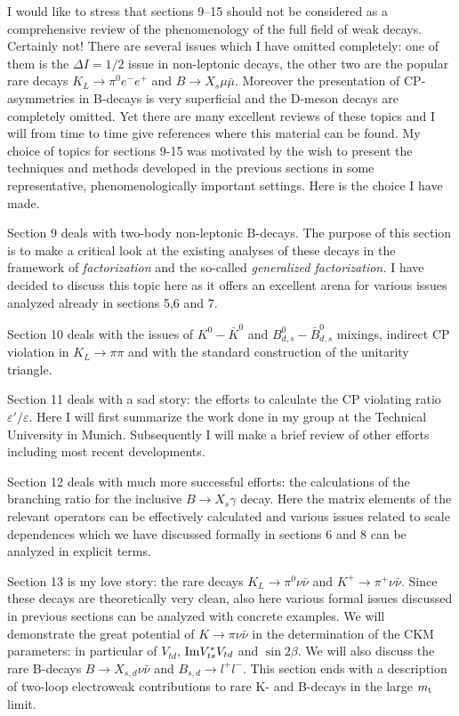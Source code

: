 \documentclass[12pt,rotate]{article}
\newcommand{\IM}{{\rm Im}}
\def\epe{\varepsilon'/\varepsilon}
\newcommand{\mt}{m_{\rm t}}
\newcommand{\Bsg}{$B \to X_s \gamma$ }
\begin{document}
I would like to stress that sections 9--15 should not be considered as a
comprehensive review of the phenomenology of the full field of weak decays.
Certainly not! There are several issues which I have omitted completely: one
of them is the $\Delta I=1/2$ issue in non-leptonic decays, 
the other two are the
popular rare decays $K_L\to\pi^0 e^-e^+$ and $B\to X_s\mu\bar\mu$. 
Moreover the presentation of CP-asymmetries in
B-decays is very superficial and the D-meson decays are completely omitted.
Yet there are many excellent reviews of these
topics and I will from time to time give references where this material can
be found. My choice of topics for sections 9-15 was motivated by the wish to
present the techniques and methods developed in the previous sections in some
representative, phenomenologically important settings. 
Here is the choice I have made.

Section 9 deals with two-body non-leptonic B-decays. 
The purpose of this section is to make a
critical look at the existing analyses of these decays in the framework of
{\it factorization} and the so-called {\it generalized factorization.}
 I have decided to
discuss this topic here as it offers an excellent arena for various issues
analyzed already in sections 5,6 and 7.

Section 10 deals with the issues of $K^0-\bar K^0$ and 
$B^0_{d,s}-\bar B^0_{d,s}$ mixings, indirect CP violation in
$K_L\to\pi\pi$ and with the standard construction of the unitarity triangle.

Section 11 deals with a sad story: the efforts to calculate the CP violating
ratio $\epe$. Here I will first summarize the work done in my group at the
Technical University in  Munich. Subsequently I will make a brief review of
other efforts including most recent developments.

Section 12 deals with much more successful efforts: the calculations of the
branching ratio for the inclusive \Bsg decay. Here the matrix elements of the
relevant operators can be effectively calculated and various issues related
to scale dependences which we have discussed formally in sections 6 and 8 can
be analyzed in explicit terms.

Section 13 is my love story: the rare decays $K_L\to\pi^0\nu\bar\nu$
and $K^+\to\pi^+\nu\bar\nu$. Since these decays are
theoretically very clean, also here various formal issues discussed in
previous sections can be analyzed with concrete examples. We will
demonstrate the great potential of $K\to\pi\nu\bar\nu$ 
in the determination of the CKM
parameters: in particular of $V_{td}$, $\IM V^{*}_{ts}V_{td}$ and
$\sin 2\beta$. We will also discuss the rare B-decays 
$B\to X_{s,d}\nu\bar\nu$ and $B_{s,d}\to l^+l^-$.
This section ends with a description of two-loop electroweak contributions to
rare K- and B-decays in the large $\mt$ limit.
\end{document}
